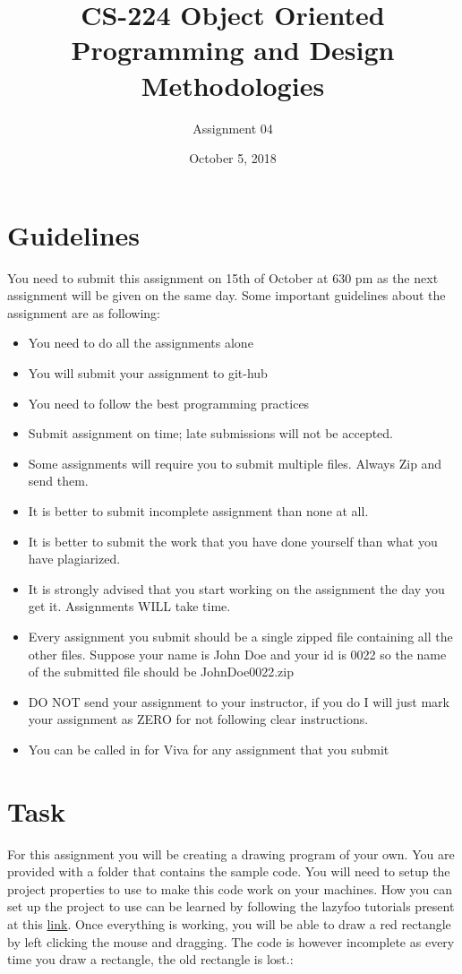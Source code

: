 \documentclass[a4paper,12pt]{article}
\begin{document}
	
	\title{CS-224 Object Oriented Programming and Design Methodologies }
	\author{Assignment 04}
	\date{October 5, 2018}
	\maketitle
	\section{Guidelines}
	You need to submit this assignment on  {\color{red}15th of October at 630 pm } as the next assignment will be given on the same day. Some important guidelines about the assignment are as following:
	
	\begin{itemize}
		\item You need to do all the assignments alone
		\item You will submit your assignment to git-hub 
		\item You need to follow the best programming practices 
		\item Submit assignment on time; late submissions will not be accepted.
		\item Some assignments will require you to submit multiple files. Always Zip and send them.
		\item It is better to submit incomplete assignment than none at all.
		\item It is better to submit the work that you have done yourself than what you have plagiarized.
		\item It is strongly advised that you start working on the assignment the day you get it. Assignments WILL take time.
		\item Every assignment you submit should be a single zipped file containing all the other files. Suppose your name is John Doe and your id is 0022 so the name of the submitted file should be JohnDoe0022.zip
		\item DO NOT send your assignment to your instructor, if you do I will just mark your assignment as ZERO for not following clear instructions.
		\item You can be called in for Viva for any assignment that you submit
	\end{itemize}
	
	\section{Task}
	For this assignment you will be creating a drawing program of your own. You are provided with a folder  that contains the sample code. You will need to setup the project properties to use  to make this code work on your machines. How you can set up the project to use  can be learned by following the lazyfoo tutorials present at this \href{http://lazyfoo.net/tutorials/SDL/}{link}. Once everything is working, you will be able to draw a red rectangle by left clicking the mouse and dragging. The code is however incomplete as every time you draw a rectangle, the old rectangle is lost.:\smallskip\\
	
\end{document}
